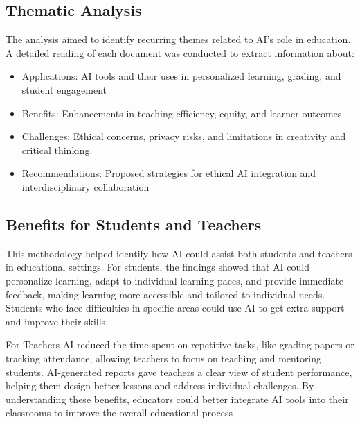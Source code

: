 \documentclass[conference]{IEEEtran}
\begin{document}
\subsection{Thematic Analysis}
The analysis aimed to identify recurring themes related to AI’s role in education. A detailed reading of each document was conducted to extract information about:

\begin{itemize}
    \item Applications: AI tools and their uses in personalized learning, grading, and student engagement
\end{itemize}

\begin{itemize}
    \item Benefits: Enhancements in teaching efficiency, equity, and learner outcomes
\end{itemize}

\begin{itemize}
    \item Challenges: Ethical concerns, privacy risks, and limitations in creativity and critical thinking.
\end{itemize}

\begin{itemize}
    \item Recommendations: Proposed strategies for ethical AI integration and interdisciplinary collaboration
\end{itemize}

\subsection{Benefits for Students and Teachers}
This methodology helped identify how AI could assist both students and teachers in educational settings. For students, the findings showed that AI could personalize learning, adapt to individual learning paces, and provide immediate feedback, making learning more accessible and tailored to individual needs. Students who face difficulties in specific areas could use AI to get extra support and improve their skills.

For Teachers AI reduced the time spent on repetitive tasks, like grading papers or tracking attendance, allowing teachers to focus on teaching and mentoring students. AI-generated reports gave teachers a clear view of student performance, helping them design better lessons and address individual challenges. By understanding these benefits, educators could better integrate AI tools into their classrooms to improve the overall educational process
\end{document}
